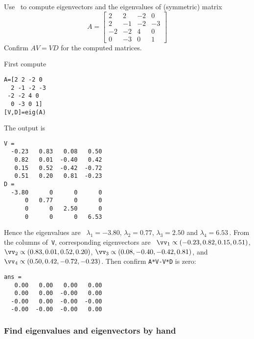\begin{example} 
Use \script\ to compute eigenvectors and the eigenvalues of (symmetric) matrix
\begin{equation*}
A=\begin{bmatrix} 2&2&-2&0
\\2&-1&-2&-3
\\-2&-2&4&0
\\0&-3&0&1
 \end{bmatrix}
\end{equation*}
Confirm \(AV=VD\) for the computed matrices.
\begin{solution} 
First compute
\setbox\ajrqrbox\hbox{}%
\marginajrbox%
\begin{verbatim}
A=[2 2 -2 0
  2 -1 -2 -3
 -2 -2 4 0
  0 -3 0 1]
[V,D]=eig(A)
\end{verbatim}
The output is \twodp
\begin{verbatim}
V =
  -0.23   0.83   0.08   0.50
   0.82   0.01  -0.40   0.42
   0.15   0.52  -0.42  -0.72
   0.51   0.20   0.81  -0.23
D =
  -3.80      0      0      0
      0   0.77      0      0
      0      0   2.50      0
      0      0      0   6.53
\end{verbatim}
Hence the eigenvalues are \twodp\ \(\lambda_1=-3.80\), \(\lambda_2=0.77\), \(\lambda_3=2.50\) and \(\lambda_4=6.53\)\,.
From the columns of~\verb|V|, corresponding eigenvectors are \twodp\  
\(\vv_1\propto(-0.23,0.82,0.15,0.51)\),
\(\vv_2\propto(0.83,0.01,0.52,0.20)\),
\(\vv_3\propto(0.08,-0.40,-0.42,0.81)\), and
\(\vv_4\propto(0.50,0.42,-0.72,-0.23)\).
Then confirm \verb|A*V-V*D| is zero:
\begin{verbatim}
ans =
   0.00   0.00   0.00   0.00
   0.00   0.00  -0.00   0.00
  -0.00   0.00  -0.00  -0.00
  -0.00  -0.00  -0.00   0.00
\end{verbatim}
\end{solution}
\end{example}








\subsubsection{Find eigenvalues and eigenvectors by hand}
\label{sec:feebh}

